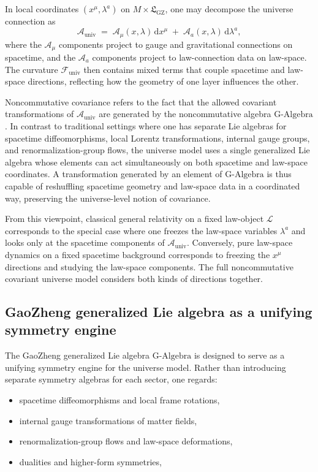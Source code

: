 \documentclass[11pt]{book}
\newcommand{\GAlgebra}{\text{G-Algebra}}
\newcommand{\GZLS}{\ensuremath{\mathfrak{L}_{\mathrm{GZ}}}}
\newcommand{\Base}{\ensuremath{M}}
\theoremstyle{plain}
\theoremstyle{definition}
\theoremstyle{remark}
\begin{document}
In local coordinates $(x^\mu,\lambda^a)$ on $\Base \times \GZLS$,
one may decompose the universe connection as
\[
   \mathcal{A}_{\mathrm{univ}}
   \;=\;
   \mathcal{A}_{\mu}(x,\lambda)\,\mathrm{d}x^\mu
   \;+\;
   \mathcal{A}_{a}(x,\lambda)\,\mathrm{d}\lambda^a,
\]
where the $\mathcal{A}_{\mu}$ components project to gauge and
gravitational connections on spacetime, and the $\mathcal{A}_{a}$
components project to law-connection data on law-space. The
curvature $\mathcal{F}_{\mathrm{univ}}$ then contains mixed terms
that couple spacetime and law-space directions, reflecting how the
geometry of one layer influences the other.

Noncommutative covariance refers to the fact that the allowed
covariant transformations of $\mathcal{A}_{\mathrm{univ}}$ are
generated by the noncommutative algebra $\GAlgebra$. In contrast to
traditional settings where one has separate Lie algebras for
spacetime diffeomorphisms, local Lorentz transformations, internal
gauge groups, and renormalization-group flows, the universe model
uses a single generalized Lie algebra whose elements can act
simultaneously on both spacetime and law-space coordinates. A
transformation generated by an element of $\GAlgebra$ is thus
capable of reshuffling spacetime geometry and law-space data in a
coordinated way, preserving the universe-level notion of covariance.

From this viewpoint, classical general relativity on a fixed
law-object $\mathcal{L}$ corresponds to the special case where one
freezes the law-space variables $\lambda^a$ and looks only at the
spacetime components of $\mathcal{A}_{\mathrm{univ}}$. Conversely,
pure law-space dynamics on a fixed spacetime background corresponds
to freezing the $x^\mu$ directions and studying the law-space
components. The full noncommutative covariant universe model
considers both kinds of directions together.

\subsection{GaoZheng generalized Lie algebra as a unifying symmetry engine}
\label{subsec:GAlgebra-engine}


The GaoZheng generalized Lie algebra $\GAlgebra$ is designed to
serve as a unifying symmetry engine for the universe model. Rather
than introducing separate symmetry algebras for each sector, one
regards:

\begin{itemize}
  \item spacetime diffeomorphisms and local frame rotations,
  \item internal gauge transformations of matter fields,
  \item renormalization-group flows and law-space deformations,
  \item dualities and higher-form symmetries,
\end{itemize}
\end{document}
